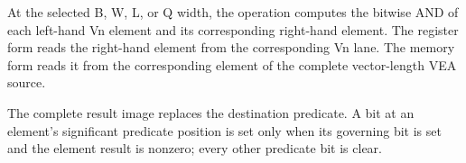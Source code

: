 At the selected B, W, L, or Q width, the operation computes the bitwise AND of
each left-hand Vn element and its corresponding right-hand element. The
register form reads the right-hand element from the corresponding Vn lane. The
memory form reads it from the corresponding element of the complete
vector-length VEA source.

The complete result image replaces the destination predicate. A bit at an
element's significant predicate position is set only when its governing bit is
set and the element result is nonzero; every other predicate bit is clear.
